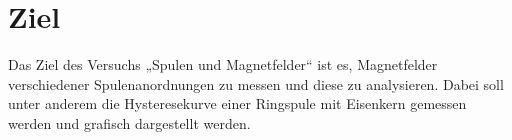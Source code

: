 \section{Ziel}
\label{sec:Ziel}
\setlength{\parindent}{0pt}

Das Ziel des Versuchs „Spulen und Magnetfelder“ ist es, Magnetfelder verschiedener Spulenanordnungen zu messen
und diese zu analysieren. Dabei soll unter anderem die Hysteresekurve einer Ringspule mit Eisenkern gemessen werden
und grafisch dargestellt werden.